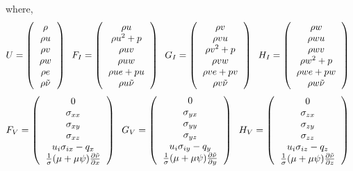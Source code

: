 where, 
\begin{equation}
U = \l(
\begin{tabular}{c}
$\rho$\\
$\rho u$\\
$\rho v$\\
$\rho w$\\
$\rho e$ \\
$\rho\tilde\nu$
\end{tabular}
\r) \;\; 
F_I = \l(
\begin{tabular}{c}
$\rho u$\\
$\rho u^2 + p$\\
$\rho uv$\\
$\rho uw$\\
$\rho ue + pu$\\
$\rho u\tilde\nu$
\end{tabular}
\r) \;\; 
G_I = \l(
\begin{tabular}{c}
$\rho v$\\
$\rho vu$\\
$\rho v^2 + p$\\
$\rho vw$\\
$\rho ve+pv$\\
$\rho v\tilde\nu$
\end{tabular}
\r) \;\; 
H_I = \l(
\begin{tabular}{c}
$\rho w$\\
$\rho wu$\\
$\rho wv$\\
$\rho w^2 + p$\\
$\rho we + pw$\\
$\rho w\tilde\nu$
\end{tabular}
\r) \;\; 
\end{equation}
\begin{equation}
F_V = \l(
\begin{tabular}{c}
$0$\\
$\sigma_{xx}$\\
$\sigma_{xy}$\\
$\sigma_{xz}$\\
$u_i\sigma_{ix}-q_x$\\
$\frac{1}{\sigma}(\mu + \mu \psi)\frac{\partial \tilde \nu}{\partial x}$
\end{tabular}
\r) \;\; 
G_V = \l(
\begin{tabular}{c}
$0$\\
$\sigma_{yx}$\\
$\sigma_{yy}$\\
$\sigma_{yz}$\\
$u_i\sigma_{iy}-q_y$\\
$\frac{1}{\sigma}(\mu + \mu \psi)\frac{\partial \tilde \nu}{\partial y}$
\end{tabular}
\r) \;\; 
H_V = \l(
\begin{tabular}{c}
$0$\\
$\sigma_{zx}$\\
$\sigma_{zy}$\\
$\sigma_{zz}$\\
$u_i\sigma_{iz}-q_z$\\
$\frac{1}{\sigma}(\mu + \mu \psi)\frac{\partial \tilde \nu}{\partial z}$
\end{tabular}
\r) \;\; 
\end{equation}
